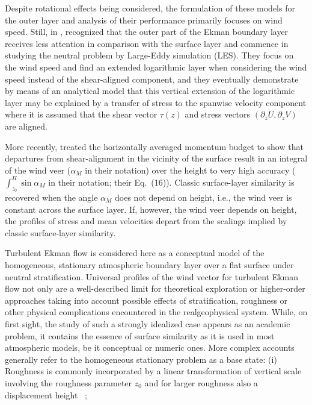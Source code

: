 \documentclass[a4paper,11pt]{amsart}
\newcommand{\p}{\partial}
\begin{document}
%
Despite rotational effects being considered, the formulation of these models for the outer layer
and analysis of their performance primarily focuses on wind speed.
% 
Still, in \citeyear{jiang:JAS2018}, \citeauthor{jiang:JAS2018}
recognized that the outer part of the Ekman boundary layer receives less attention in comparison
with the surface layer and commence in studying the neutral problem by Large-Eddy simulation (LES).
%
They focus on the wind speed and find an extended logarithmic layer when considering the wind speed instead of
the shear-aligned component, and they eventually demonstrate by means of an analytical model that this vertical
extension of the logarithmic layer may be explained by a transfer of stress to the spanwise velocity component where
it is assumed that the shear vector $\tau(z)$ and stress vectors $(\p_zU,\p_zV)$ are aligned. 
%
\par
% 
More recently, \citet{ghannam:QJR2021} treated the horizontally averaged momentum budget to show that departures from
shear-alignment in the vicinity of the surface result in an integral of the wind veer ($\alpha_M$ in their notation)
over the height to very high accuracy ($\int_{z_0}^{H} \sin\alpha_M$ in their notation; their Eq.~(16)).
%
Classic surface-layer similarity is recovered when the angle $\alpha_M$ does not depend on height, i.e., the
wind veer is constant across the surface layer. 
%
If, however, the wind veer depends on height, the profiles of stress and mean velocities depart from the
scalings implied by classic surface-layer similarity.
%
\par
%
Turbulent Ekman flow is considered here as a conceptual model of the
homogeneous, stationary atmospheric boundary layer over a flat surface under neutral stratification. 
%
Universal profiles of the wind vector for turbulent Ekman flow not only are a well-described limit
for theoretical exploration or higher-order approaches taking into account possible effects of stratification,
roughness or other physical complications encountered in the realgeophysical system.
%
While, on first sight, the study of such a strongly idealized case appears as an academic problem, it contains the essence
of surface similarity as it is used in most atmospheric models, be it conceptual or numeric ones.
%
More complex accounts generally refer to the homogeneous stationary problem as a base state: 
%
(i) Roughness is commonly incorporated by a linear transformation of vertical scale involving the
roughness parameter $z_0$ and for larger roughness also a displacement height~%
\citep{monin:1975,jacobs:AFM1988,hogstrom:BM1988};
\end{document}
